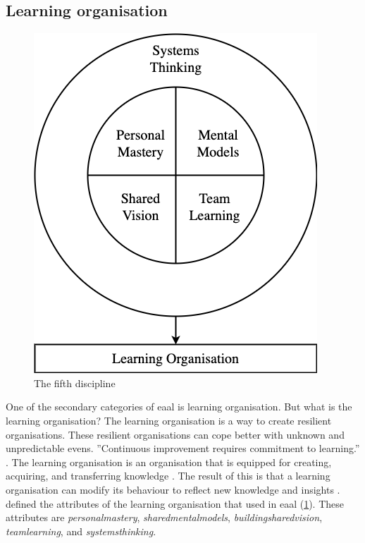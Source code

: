 \subsection{Learning organisation}
\label{sub:learningorganisation}
\begin{figure}
		\centering
		\includegraphics[width=\linewidth]{images/fithdiscipline}
		\caption[The fifth discipline]{The fifth discipline}
		\label{fig:fithdiscipline}
\end{figure}
One of the secondary categories of \acrlong{eaal} is learning organisation. But what is the learning organisation? The learning organisation is a way to create resilient organisations. These resilient organisations can cope better with unknown and unpredictable evens. ''Continuous improvement requires commitment to learning.'' \parencite{Garvin1993}. The learning organisation is an organisation that is equipped for creating, acquiring, and transferring knowledge \parencite{Garvin1993}. The result of this is that a learning organisation can modify its behaviour to reflect new knowledge and insights \parencite{Garvin1993}. \textcite{Senge1994} defined the \glspl{attribute} of the learning organisation that \textcite{Botjes2021} used in \acrlong{eaal} (\cref{fig:fithdiscipline}). These attributes are \textit{\gls{personalmastery}}, \textit{\glspl{sharedmentalmodel}}, \textit{\gls{buildingsharedvision}}, \textit{\gls{teamlearning}}, and \textit{\gls{systemsthinking}}.
